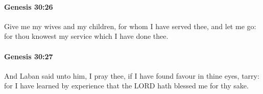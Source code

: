 		\paragraph{Genesis 30:26} %
			\label{GENESIS-30-26}

			Give me my wives and my children, for whom I have served thee, and let me go: for thou knowest my service which I have done thee.


		\paragraph{Genesis 30:27} %
			\label{GENESIS-30-27}

			And Laban said unto him, I pray thee, if I have found favour in thine eyes, tarry: for I have learned by experience that the LORD hath blessed me for thy sake.


